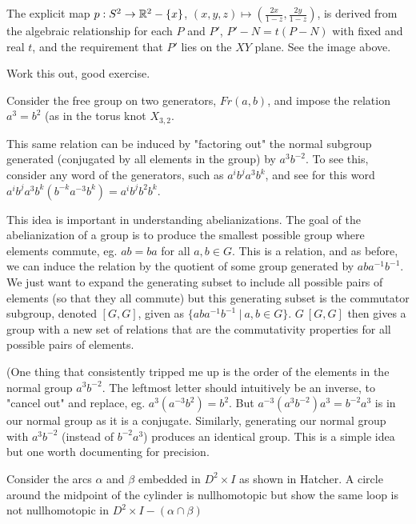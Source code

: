 \documentclass[10pt]{article}
\begin{document}
\begin{note}

	The explicit map $p: S^2 \to \mathbb{R}^2 - \{ x \}$, $(x, y, z) \mapsto
	(\frac{2x}{1-z}, \frac{2y}{1-z})$, is derived from the algebraic relationship
	for each $P$ and $P'$, $P' - N = t(P - N)$ with fixed and real $t$, and the
	requirement that $P'$ lies on the $XY$ plane. See the image above.

	Work this out, good exercise.
\end{note}


\begin{note}

Consider the free group on two generators, $Fr(a, b)$, and impose the
relation $a^3 = b^2$ (as in the torus knot $X_{3, 2}$.

This same relation can be induced by "factoring out" the normal subgroup
generated (conjugated by all elements in the group) by $a^3b^{-2}$. To see this, consider any word of the
generators, such as $a^ib^ja^3b^k$, and see for this word $a^ib^ja^3b^k (b^{-k}a^{-3}b^k) =
a^ib^jb^2b^k$. 

This idea is important in understanding abelianizations. The goal of the
abelianization of a group is to produce the smallest possible group where
elements commute, eg. $ab = ba$ for all $a, b \in G$. This is a relation, and
as before, we can induce the relation by the quotient of some group generated
by $aba^{-1}b^{-1}$. We just want to expand the generating subset to include
all possible pairs of elements (so that they all commute) but this generating
subset is the commutator subgroup, denoted $[G, G]$, given as $\{
aba^{-1}b^{-1} ~|~ a, b \in G\}$. $G \ [G, G]$ then gives a group with a new
set of relations that are the commutativity properties for all possible pairs
of elements.

(One thing that consistently tripped me up is the order of the elements in the
normal group $a^3b^{-2}$. The leftmost letter should intuitively be an inverse,
to "cancel out" and replace, eg. $a^3 (a^{-3}b^2) = b^2$. But $a^{-3} (a^3b^{-2}) a^3 = b^{-2}a^3$
is in our normal group as it is a conjugate. Similarly, generating our normal
group with $a^3b^{-2}$ (instead of $b^{-2}a^3$) produces an identical group.
This is a simple idea but one worth documenting for precision.
\end{note}

\begin{exercise}[1.2.10]
	Consider the arcs $\alpha$ and $\beta$ embedded in $D^2\times I$ as shown in
	Hatcher. A circle around the midpoint of the cylinder is nullhomotopic but
	show the same loop is not nullhomotopic in $D^2\times I - (\alpha \cap \beta)$
\end{exercise}
\end{document}
